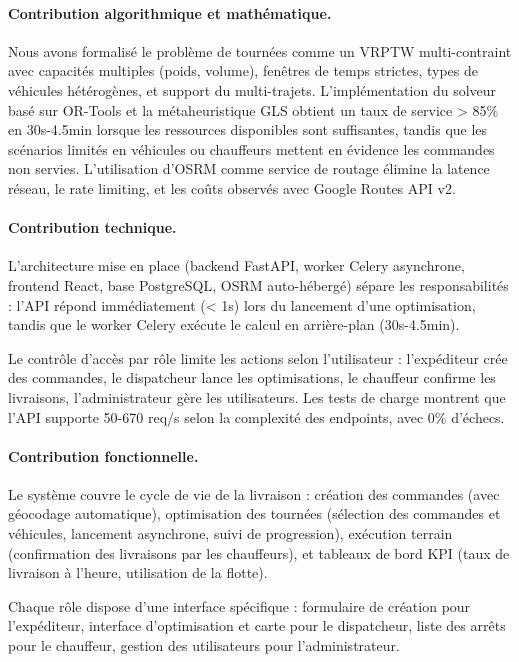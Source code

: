 \documentclass[12pt,a4paper]{report}
\begin{document}
\paragraph{Contribution algorithmique et mathématique.} Nous avons formalisé le problème de tournées comme un VRPTW multi-contraint avec capacités multiples (poids, volume), fenêtres de temps strictes, types de véhicules hétérogènes, et support du multi-trajets. L'implémentation du solveur basé sur OR-Tools et la métaheuristique GLS obtient un taux de service > 85\% en 30s-4.5min lorsque les ressources disponibles sont suffisantes, tandis que les scénarios limités en véhicules ou chauffeurs mettent en évidence les commandes non servies. L'utilisation d'OSRM comme service de routage élimine la latence réseau, le rate limiting, et les coûts observés avec Google Routes API v2.

\paragraph{Contribution technique.} L'architecture mise en place (backend FastAPI, worker Celery asynchrone, frontend React, base PostgreSQL, OSRM auto-hébergé) sépare les responsabilités : l'API répond immédiatement (< 1s) lors du lancement d'une optimisation, tandis que le worker Celery exécute le calcul en arrière-plan (30s-4.5min).

Le contrôle d'accès par rôle limite les actions selon l'utilisateur : l'expéditeur crée des commandes, le dispatcheur lance les optimisations, le chauffeur confirme les livraisons, l'administrateur gère les utilisateurs. Les tests de charge montrent que l'API supporte 50-670 req/s selon la complexité des endpoints, avec 0\% d'échecs.

\paragraph{Contribution fonctionnelle.} Le système couvre le cycle de vie de la livraison : création des commandes (avec géocodage automatique), optimisation des tournées (sélection des commandes et véhicules, lancement asynchrone, suivi de progression), exécution terrain (confirmation des livraisons par les chauffeurs), et tableaux de bord KPI (taux de livraison à l'heure, utilisation de la flotte).

Chaque rôle dispose d'une interface spécifique : formulaire de création pour l'expéditeur, interface d'optimisation et carte pour le dispatcheur, liste des arrêts pour le chauffeur, gestion des utilisateurs pour l'administrateur.
\end{document}
